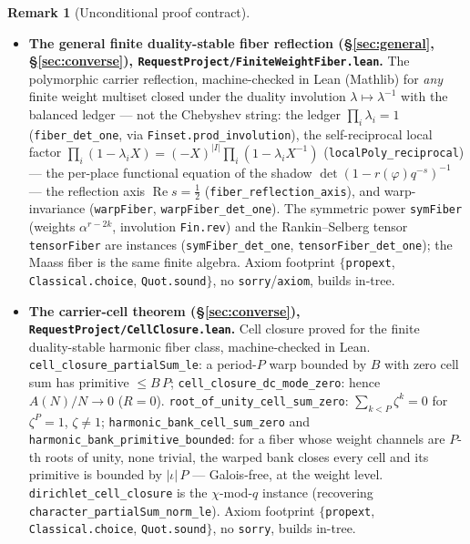 \documentclass[11pt]{article}
\theoremstyle{definition}
\newtheorem{remark}[theorem]{Remark}
\renewcommand{\Re}{\operatorname{Re}}
\begin{document}
\begin{remark}[Unconditional proof contract]
\begin{enumerate}
\begin{itemize}
\item \textbf{The general finite duality-stable fiber reflection (\S\ref{sec:general},
\S\ref{sec:converse}), \texttt{RequestProject/FiniteWeightFiber.lean}.} The polymorphic carrier
reflection, machine-checked in Lean (Mathlib) for \emph{any} finite weight multiset closed under the
duality involution $\lambda\mapsto\lambda^{-1}$ with the balanced ledger --- not the Chebyshev string:
the ledger $\prod_i\lambda_i=1$ (\texttt{fiber\_det\_one}, via \texttt{Finset.prod\_involution}), the
self-reciprocal local factor $\prod_i(1-\lambda_iX)=(-X)^{|I|}\prod_i(1-\lambda_iX^{-1})$
(\texttt{localPoly\_reciprocal}) --- the per-place functional equation of the shadow
$\det(1-r(\varphi)q^{-s})^{-1}$ --- the reflection axis $\Re s=\tfrac12$
(\texttt{fiber\_reflection\_axis}), and warp-invariance (\texttt{warpFiber}, \texttt{warpFiber\_det\_one}).
The symmetric power \texttt{symFiber} (weights $\alpha^{r-2k}$, involution \texttt{Fin.rev}) and the
Rankin--Selberg tensor \texttt{tensorFiber} are instances (\texttt{symFiber\_det\_one},
\texttt{tensorFiber\_det\_one}); the Maass fiber is the same finite algebra.  Axiom footprint
$\{$\texttt{propext}, \texttt{Classical.choice}, \texttt{Quot.sound}$\}$, no \texttt{sorry}/\texttt{axiom},
builds in-tree.

\item \textbf{The carrier-cell theorem (\S\ref{sec:converse}), \texttt{RequestProject/CellClosure.lean}.}
Cell closure proved for the finite duality-stable harmonic fiber class, machine-checked in Lean.
\texttt{cell\_closure\_partialSum\_le}: a period-$P$ warp bounded by $B$ with zero cell sum has primitive
$\le B\,P$; \texttt{cell\_closure\_dc\_mode\_zero}: hence $A(N)/N\to0$ ($R=0$). \texttt{root\_of\_unity\_cell\_sum\_zero}:
$\sum_{k<P}\zeta^k=0$ for $\zeta^P=1$, $\zeta\ne1$; \texttt{harmonic\_bank\_cell\_sum\_zero} and
\texttt{harmonic\_bank\_primitive\_bounded}: for a fiber whose weight channels are $P$-th roots of unity,
none trivial, the warped bank closes every cell and its primitive is bounded by $|\iota|\,P$ --- Galois-free,
at the weight level. \texttt{dirichlet\_cell\_closure} is the $\chi$-mod-$q$ instance (recovering
\texttt{character\_partialSum\_norm\_le}). Axiom footprint $\{$\texttt{propext}, \texttt{Classical.choice},
\texttt{Quot.sound}$\}$, no \texttt{sorry}, builds in-tree.


\end{itemize}
\end{enumerate}
\end{remark}
\end{document}
